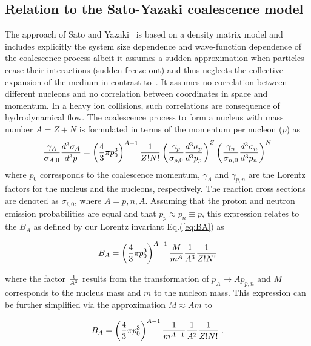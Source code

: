 \documentclass[a4paper,11pt]{scrartcl}
\begin{document}
\begin{appendix}
\section{Relation to the Sato-Yazaki coalescence model}\label{appendix:Sato}
The approach of Sato and Yazaki~\cite{Sato:1981ez} is based on a density matrix model and includes explicitly the system size dependence and wave-function dependence of the coalescence process albeit it assumes a sudden approximation when particles cease their interactions (sudden freeze-out) and thus neglects the collective expansion of the medium in contrast to~\cite{Scheibl:1998tk}. It assumes no correlation between different nucleons and no correlation between coordinates in space and momentum. In a heavy ion collisions, such correlations are consequence of hydrodynamical flow. 
The coalescence process to form a nucleus with mass number $A = Z + N$ is formulated in terms of the momentum per nucleon ($p$) as
%
\begin{equation}
\frac{\gamma_{A}}{\sigma_{A,0}} \frac{d^{3}\sigma_{A}}{d^{3}p} =  \left( {4 \over 3} \pi p_{0}^{3}\right)^{A-1}\frac{1}{Z! N!} \left(\frac{\gamma_{p}}{\sigma_{p,0}} \frac{d^{3}\sigma_{p}}{d^{3}p_{p}}\right)^{Z} \left(\frac{\gamma_{n}}{\sigma_{n,0}} \frac{d^{3}\sigma_{n}}{d^{3}p_{n}}\right)^{N} 
\end{equation} 
%
where $p_{0}$ corresponds to the coalescence momentum, $\gamma_{A}$ and $\gamma_{p,n}$ are the Lorentz factors for the nucleus and the nucleons, respectively. The reaction cross sections are denoted as $\sigma_{i,0}$, where $A = p, n, A$.
Assuming that the proton and neutron emission probabilities are equal and that $p_{p} \approx p_{n} \equiv p$, this expression relates to the $B_{A}$ as defined by our Lorentz invariant Eq.(\ref{eq:BA}) as

\begin{equation}
B_{A} = \left({4 \over 3} \pi p_{0}^{3}\right)^{A-1} {M \over m^{A}} {1 \over A^{3}}{\frac{1}{Z! N!}}
\end{equation}

\noindent where the factor ${1 \over A^{3}}$ results from the transformation of $p_{A} \rightarrow A p_{p,n}$ and $M$ corresponds to the nucleus mass and $m$ to the nucleon mass. This expression can be further simplified via the approximation $M \approx A m$ to

\begin{equation}
B_{A} = \left({4 \over 3} \pi p_{0}^{3}\right)^{A-1} {1 \over m^{A-1}} {1 \over A^{2}}{\frac{1}{Z! N!}} \; .
\end{equation}


\end{appendix}
\end{document}
